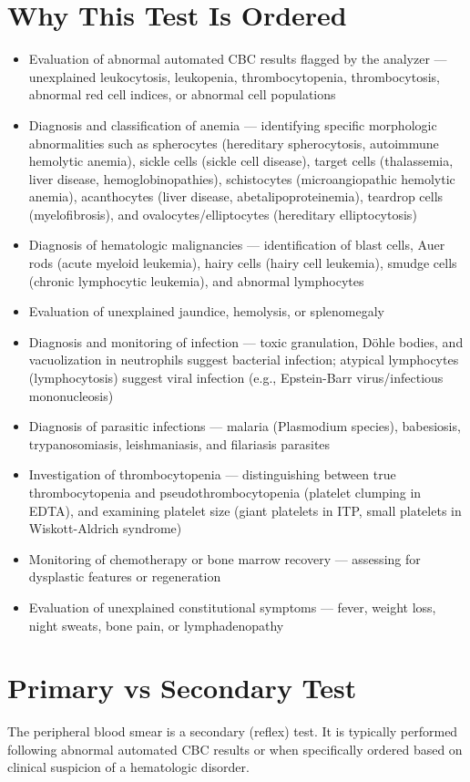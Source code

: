 \section*{Why This Test Is Ordered}
\begin{itemize}
  \item Evaluation of abnormal automated CBC results flagged by the analyzer --- unexplained leukocytosis, leukopenia, thrombocytopenia, thrombocytosis, abnormal red cell indices, or abnormal cell populations
  \item Diagnosis and classification of anemia --- identifying specific morphologic abnormalities such as spherocytes (hereditary spherocytosis, autoimmune hemolytic anemia), sickle cells (sickle cell disease), target cells (thalassemia, liver disease, hemoglobinopathies), schistocytes (microangiopathic hemolytic anemia), acanthocytes (liver disease, abetalipoproteinemia), teardrop cells (myelofibrosis), and ovalocytes/elliptocytes (hereditary elliptocytosis)
  \item Diagnosis of hematologic malignancies --- identification of blast cells, Auer rods (acute myeloid leukemia), hairy cells (hairy cell leukemia), smudge cells (chronic lymphocytic leukemia), and abnormal lymphocytes
  \item Evaluation of unexplained jaundice, hemolysis, or splenomegaly
  \item Diagnosis and monitoring of infection --- toxic granulation, D\"{o}hle bodies, and vacuolization in neutrophils suggest bacterial infection; atypical lymphocytes (lymphocytosis) suggest viral infection (e.g., Epstein-Barr virus/infectious mononucleosis)
  \item Diagnosis of parasitic infections --- malaria (Plasmodium species), babesiosis, trypanosomiasis, leishmaniasis, and filariasis parasites
  \item Investigation of thrombocytopenia --- distinguishing between true thrombocytopenia and pseudothrombocytopenia (platelet clumping in EDTA), and examining platelet size (giant platelets in ITP, small platelets in Wiskott-Aldrich syndrome)
  \item Monitoring of chemotherapy or bone marrow recovery --- assessing for dysplastic features or regeneration
  \item Evaluation of unexplained constitutional symptoms --- fever, weight loss, night sweats, bone pain, or lymphadenopathy
\end{itemize}

\section*{Primary vs Secondary Test}
The peripheral blood smear is a secondary (reflex) test. It is typically performed following abnormal automated CBC results or when specifically ordered based on clinical suspicion of a hematologic disorder.

